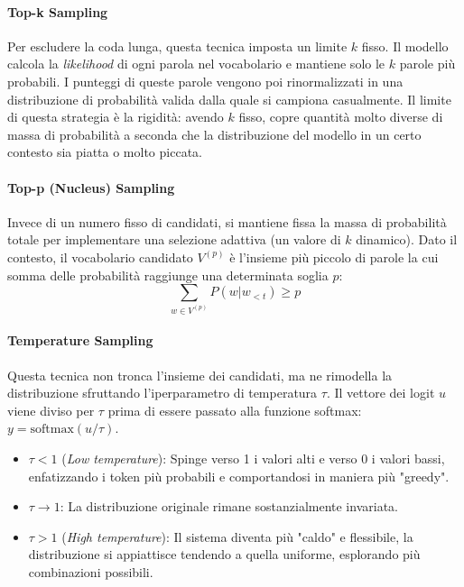         \paragraph{Top-k Sampling}
        Per escludere la coda lunga, questa tecnica imposta un limite $k$ fisso. Il modello calcola la \textit{likelihood} di ogni parola nel vocabolario e mantiene solo le $k$ parole più probabili. I punteggi di queste parole vengono poi rinormalizzati in una distribuzione di probabilità valida dalla quale si campiona casualmente. Il limite di questa strategia è la rigidità: avendo $k$ fisso, copre quantità molto diverse di massa di probabilità a seconda che la distribuzione del modello in un certo contesto sia piatta o molto piccata.

        \paragraph{Top-p (Nucleus) Sampling}
        Invece di un numero fisso di candidati, si mantiene fissa la massa di probabilità totale per implementare una selezione adattiva (un valore di $k$ dinamico). Dato il contesto, il vocabolario candidato $V^{(p)}$ è l'insieme più piccolo di parole la cui somma delle probabilità raggiunge una determinata soglia $p$:
        $$\sum_{w \in V^{(p)}} P(w|w_{<t}) \ge p$$

        \paragraph{Temperature Sampling}
        Questa tecnica non tronca l'insieme dei candidati, ma ne rimodella la distribuzione sfruttando l'iperparametro di temperatura $\tau$. Il vettore dei logit $u$ viene diviso per $\tau$ prima di essere passato alla funzione softmax:
        $y = \text{softmax}(u/\tau)$.
        \begin{itemize}
            \item $\tau < 1$ (\textit{Low temperature}): Spinge verso 1 i valori alti e verso 0 i valori bassi, enfatizzando i token più probabili e comportandosi in maniera più "greedy".
            \item $\tau \to 1$: La distribuzione originale rimane sostanzialmente invariata.
            \item $\tau > 1$ (\textit{High temperature}): Il sistema diventa più "caldo" e flessibile, la distribuzione si appiattisce tendendo a quella uniforme, esplorando più combinazioni possibili.
        \end{itemize}

